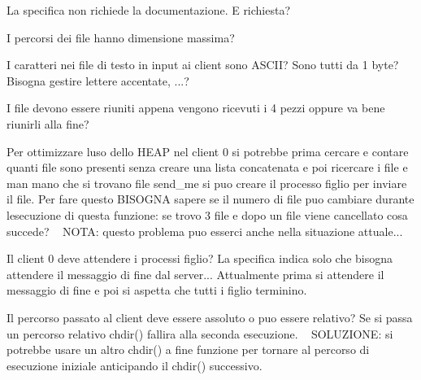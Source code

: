 
\begin{DoxyRefList}
\item[\label{warning__warning000001}%
\Hypertarget{warning__warning000001}%
File \hyperlink{client_8c}{client.c} ]La specifica non richiede la documentazione. E\textquotesingle{} richiesta?

I percorsi dei file hanno dimensione massima?

I caratteri nei file di testo in input ai client sono A\+S\+C\+II? Sono tutti da 1 byte? Bisogna gestire lettere accentate, ...?  
\item[\label{warning__warning000007}%
\Hypertarget{warning__warning000007}%
Globale \hyperlink{server_8c_a0ddf1224851353fc92bfbff6f499fa97}{main} (int argc, char $\ast$argv\mbox{[}\mbox{]})]I file devono essere riuniti appena vengono ricevuti i 4 pezzi oppure va bene riunirli alla fine?  
\item[\label{warning__warning000004}%
\Hypertarget{warning__warning000004}%
Globale \hyperlink{client_8h_a8c7084a254c7cd640d66e647795ff8f6}{operazioni\+\_\+client0} ()]Per ottimizzare l\textquotesingle{}uso dello H\+E\+AP nel client 0 si potrebbe prima cercare e contare quanti file sono presenti senza creare una lista concatenata e poi ricercare i file e man mano che si trovano file send\+\_\+me si puo\textquotesingle{} creare il processo figlio per inviare il file. Per fare questo B\+I\+S\+O\+G\+NA sapere se il numero di file puo\textquotesingle{} cambiare durante l\textquotesingle{}esecuzione di questa funzione\+: se trovo 3 file e dopo un file viene cancellato cosa succede? ~\newline
 N\+O\+TA\+: questo problema puo\textquotesingle{} esserci anche nella situazione attuale...

Il client 0 deve attendere i processi figlio? La specifica indica solo che bisogna attendere il messaggio di fine dal server... Attualmente prima si attendere il messaggio di fine e poi si aspetta che tutti i figlio terminino.

Il percorso passato al client deve essere assoluto o puo\textquotesingle{} essere relativo? Se si passa un percorso relativo chdir() fallira\textquotesingle{} alla seconda esecuzione. ~\newline
 S\+O\+L\+U\+Z\+I\+O\+NE\+: si potrebbe usare un altro chdir() a fine funzione per tornare al percorso di esecuzione iniziale anticipando il chdir() successivo.
\end{DoxyRefList}